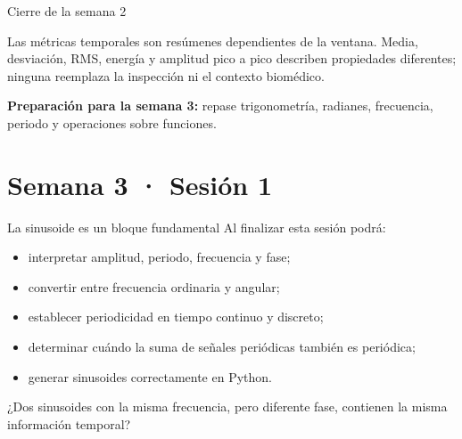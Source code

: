 \documentclass[
  ignorenonframetext,
  aspectratio=169,
  spanish,
  professionalfonts]{beamer}
\providecommand{\tightlist}{%
  \setlength{\itemsep}{0pt}\setlength{\parskip}{0pt}}
\begin{document}
\begin{frame}{Cierre de la semana 2}
\protect{}\label{cierre-de-la-semana-2}
\begin{tcolorbox}[enhanced jigsaw, arc=.35mm, bottomrule=.15mm, bottomtitle=1mm, breakable, colback=white, colbacktitle=quarto-callout-important-color!10!white, colframe=quarto-callout-important-color-frame, coltitle=black, left=2mm, leftrule=.75mm, opacityback=0, opacitybacktitle=0.6, rightrule=.15mm, title={Síntesis}, titlerule=0mm, toprule=.15mm, toptitle=1mm]

Las métricas temporales son resúmenes dependientes de la ventana. Media,
desviación, RMS, energía y amplitud pico a pico describen propiedades
diferentes; ninguna reemplaza la inspección ni el contexto biomédico.

\end{tcolorbox}

\textbf{Preparación para la semana 3:} repase trigonometría, radianes,
frecuencia, periodo y operaciones sobre funciones.
\end{frame}

\section{Semana 3 · Sesión 1}\label{semana-3-sesiuxf3n-1}

\begin{frame}{La sinusoide es un bloque fundamental}
\protect{}\label{la-sinusoide-es-un-bloque-fundamental}
Al finalizar esta sesión podrá:

\begin{itemize}
\tightlist
\item
  interpretar amplitud, periodo, frecuencia y fase;
\item
  convertir entre frecuencia ordinaria y angular;
\item
  establecer periodicidad en tiempo continuo y discreto;
\item
  determinar cuándo la suma de señales periódicas también es periódica;
\item
  generar sinusoides correctamente en Python.
\end{itemize}

\begin{tcolorbox}[enhanced jigsaw, arc=.35mm, bottomrule=.15mm, bottomtitle=1mm, breakable, colback=white, colbacktitle=quarto-callout-note-color!10!white, colframe=quarto-callout-note-color-frame, coltitle=black, left=2mm, leftrule=.75mm, opacityback=0, opacitybacktitle=0.6, rightrule=.15mm, title={Pregunta inicial}, titlerule=0mm, toprule=.15mm, toptitle=1mm]

¿Dos sinusoides con la misma frecuencia, pero diferente fase, contienen
la misma información temporal?

\end{tcolorbox}
\end{frame}
\end{document}
